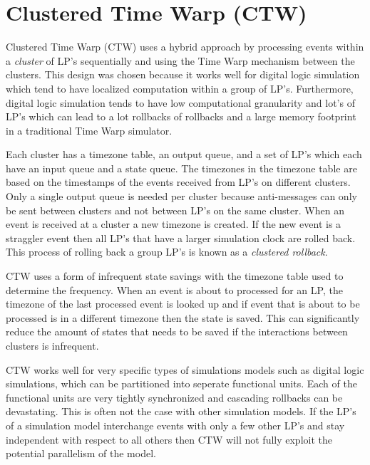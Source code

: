 \documentclass[11pt]{book}
\begin{document}

\section{Clustered Time Warp (CTW)}

Clustered Time Warp (CTW) uses a hybrid approach by processing events within a \emph{cluster} of
LP's sequentially and using the Time Warp mechanism between the clusters. This design was chosen
because it works well for digital logic simulation which tend to have localized computation within
a group of LP's. Furthermore, digital logic simulation tends to have low computational granularity
and lot's of LP's which can lead to a lot rollbacks of rollbacks and a large memory footprint in
a traditional Time Warp simulator.

Each cluster has a timezone table, an output queue, and a set of LP's which each have an input queue
and a state queue. The timezones in the timezone table are based on the timestamps of the events
received from LP's on different clusters. Only a single output queue is needed per cluster because
anti-messages can only be sent between clusters and not between LP's on the same cluster. When an
event is received at a cluster a new timezone is created. If the new event is a straggler event then
all LP's that have a larger simulation clock are rolled back. This process of rolling back a group
LP's is known as a \emph{clustered rollback}.

CTW uses a form of infrequent state savings with the timezone table used to determine the frequency.
When an event is about to processed for an LP, the timezone of the last processed event is looked up
and if event that is about to be processed is in a different timezone then the state is saved.
This can significantly reduce the amount of states that needs to be saved if the interactions
between clusters is infrequent.

CTW works well for very specific types of simulations models such as digital logic simulations,
which can be partitioned into seperate functional units. Each of the functional units are very tightly
synchronized and cascading rollbacks can be devastating. This is often not the case with other
simulation models. If the LP's of a simulation model interchange events with only a few other LP's
and stay independent with respect to all others then CTW will not fully exploit the potential
parallelism of the model.
\end{document}
